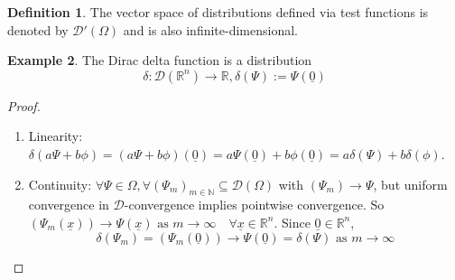 \documentclass[12pt,a4paper]{article}
\theoremstyle{definition}
\newtheorem{definition}{Definition}[subsection]
\newtheorem{example}[definition]{Example}
\begin{document}
\begin{definition}
	The vector space of distributions defined via test functions is denoted by $\mathcal{D}'(\Omega)$ and is also infinite-dimensional.
\end{definition}

\begin{example}
	The Dirac delta function is a distribution
	\[
		\delta: \mathcal{D}(\mathbb{R}^n) \rightarrow \mathbb{R}, \delta(\Psi) := \Psi(\underline{0})
	\]
\end{example}

\begin{proof}
	\hfill
	\begin{enumerate}
		\item Linearity: $\delta(a \Psi + b \phi) = (a \Psi + b \phi) (\underline{0}) = a \Psi(\underline{0}) + b \phi(\underline{0}) = a \delta (\Psi) + b \delta(\phi)$.
		\item Continuity: $\forall \Psi \in \mathcal{\Omega}, \forall {(\Psi_m)}_{m \in \mathbb{N}} \subseteq \mathcal{D}(\Omega)$ with $(\Psi_m) \rightarrow \Psi$, but uniform convergence in $\mathcal{D}$-convergence implies pointwise convergence. So $(\Psi_m(\underline{x})) \rightarrow \Psi(\underline{x}) \text{ as } m \rightarrow \infty \quad \forall \underline{x} \in \mathbb{R}^n$. Since $\underline{0} \in \mathbb{R}^n$,
		\[
			\delta(\Psi_m) = (\Psi_m (\underline{0})) \rightarrow \Psi (\underline{0}) = \delta (\Psi) \text{ as } m \rightarrow \infty
		\]
	\end{enumerate}
\end{proof}
\end{document}
